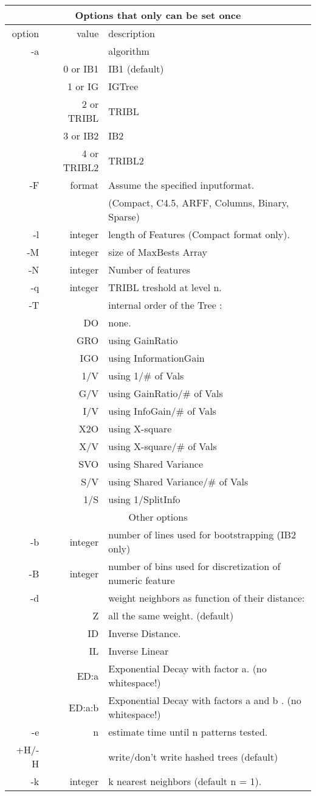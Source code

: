 \begin{tabular}{|r|r|l|}
\hline
\multicolumn{3}{|c|}{Options that only can be set {\bf once}}\\
\hline
option & value & description \\
\hline
-a &    & algorithm \\
   & 0 or IB1   & IB1     (default)\\
   & 1 or IG    & IGTree \\
   & 2 or TRIBL & TRIBL \\
   & 3 or IB2   & IB2 \\
   & 4 or TRIBL2 & TRIBL2 \\
-F & format & Assume the specified inputformat. \\
 & &     (Compact, C4.5, ARFF, Columns, Binary, Sparse) \\
-l & integer & length of Features (Compact format only). \\
-M & integer & size of MaxBests Array \\
-N & integer & Number of features \\
-q & integer & TRIBL treshold at level n. \\
-T &     & internal order of the Tree : \\
   & DO  & none. \\
   & GRO & using GainRatio \\
   & IGO & using InformationGain \\
   & 1/V & using 1/\# of Vals \\
   & G/V & using GainRatio/\# of Vals \\
   & I/V & using InfoGain/\# of Vals \\
   & X2O & using X-square \\
   & X/V & using X-square/\# of Vals \\
   & SVO & using Shared Variance \\
   & S/V & using Shared Variance/\# of Vals \\
   & 1/S & using 1/SplitInfo \\
\hline
\multicolumn{3}{|c|}{Other options}\ \\
\hline
-b & integer  & number of lines used for bootstrapping (IB2 only)\\
-B & integer  & number of bins used for discretization of numeric feature\\
-d &     & weight neighbors as function of their distance: \\
   &  Z  & all the same weight. (default) \\
   & ID  & Inverse Distance. \\
   & IL  & Inverse Linear \\
   & ED:a & Exponential Decay with factor a. (no whitespace!) \\
   & ED:a:b & Exponential Decay with factors a and b . (no whitespace!) \\
-e & n   &  estimate time until n patterns tested. \\
+H/-H & & write/don't write hashed trees (default) \\
-k & integer & k nearest neighbors (default n = 1). \\
\hline
\end{tabular}

